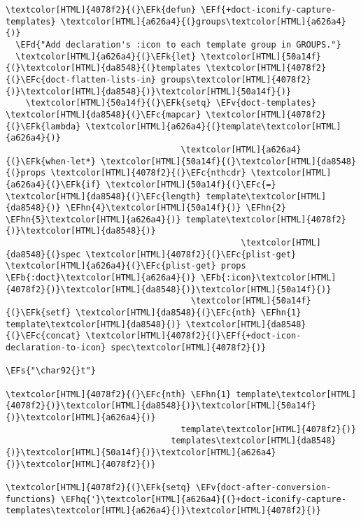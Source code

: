 \documentclass{scrartcl}
\newcommand{\EFk}[1]{\textcolor{EFk}{#1}} %
\newcommand{\EFd}[1]{\textcolor{EFd}{\textit{#1}}} %
\newcommand{\EFs}[1]{\textcolor{EFs}{#1}} %
\newcommand{\EFb}[1]{\textcolor{EFb}{#1}} %
\newcommand{\EFc}[1]{\textcolor{EFc}{#1}} %
\newcommand{\EFv}[1]{\textcolor{EFv}{#1}} %
\newcommand{\EFf}[1]{\textcolor{EFf}{#1}} %
\newcommand{\EFhn}[1]{\textcolor{EFhn}{\textbf{#1}}} %
\newcommand{\EFhq}[1]{\textcolor{EFhq}{#1}} %
\begin{document}
\begin{Code}
\begin{Verbatim}[]
\textcolor[HTML]{4078f2}{(}\EFk{defun} \EFf{+doct-iconify-capture-templates} \textcolor[HTML]{a626a4}{(}groups\textcolor[HTML]{a626a4}{)}
  \EFd{"Add declaration's :icon to each template group in GROUPS."}
  \textcolor[HTML]{a626a4}{(}\EFk{let} \textcolor[HTML]{50a14f}{(}\textcolor[HTML]{da8548}{(}templates \textcolor[HTML]{4078f2}{(}\EFc{doct-flatten-lists-in} groups\textcolor[HTML]{4078f2}{)}\textcolor[HTML]{da8548}{)}\textcolor[HTML]{50a14f}{)}
    \textcolor[HTML]{50a14f}{(}\EFk{setq} \EFv{doct-templates} \textcolor[HTML]{da8548}{(}\EFc{mapcar} \textcolor[HTML]{4078f2}{(}\EFk{lambda} \textcolor[HTML]{a626a4}{(}template\textcolor[HTML]{a626a4}{)}
                                   \textcolor[HTML]{a626a4}{(}\EFk{when-let*} \textcolor[HTML]{50a14f}{(}\textcolor[HTML]{da8548}{(}props \textcolor[HTML]{4078f2}{(}\EFc{nthcdr} \textcolor[HTML]{a626a4}{(}\EFk{if} \textcolor[HTML]{50a14f}{(}\EFc{=} \textcolor[HTML]{da8548}{(}\EFc{length} template\textcolor[HTML]{da8548}{)} \EFhn{4}\textcolor[HTML]{50a14f}{)} \EFhn{2} \EFhn{5}\textcolor[HTML]{a626a4}{)} template\textcolor[HTML]{4078f2}{)}\textcolor[HTML]{da8548}{)}
                                               \textcolor[HTML]{da8548}{(}spec \textcolor[HTML]{4078f2}{(}\EFc{plist-get} \textcolor[HTML]{a626a4}{(}\EFc{plist-get} props \EFb{:doct}\textcolor[HTML]{a626a4}{)} \EFb{:icon}\textcolor[HTML]{4078f2}{)}\textcolor[HTML]{da8548}{)}\textcolor[HTML]{50a14f}{)}
                                     \textcolor[HTML]{50a14f}{(}\EFk{setf} \textcolor[HTML]{da8548}{(}\EFc{nth} \EFhn{1} template\textcolor[HTML]{da8548}{)} \textcolor[HTML]{da8548}{(}\EFc{concat} \textcolor[HTML]{4078f2}{(}\EFf{+doct-icon-declaration-to-icon} spec\textcolor[HTML]{4078f2}{)}
                                                                    \EFs{"\char92{}t"}
                                                                    \textcolor[HTML]{4078f2}{(}\EFc{nth} \EFhn{1} template\textcolor[HTML]{4078f2}{)}\textcolor[HTML]{da8548}{)}\textcolor[HTML]{50a14f}{)}\textcolor[HTML]{a626a4}{)}
                                   template\textcolor[HTML]{4078f2}{)}
                                 templates\textcolor[HTML]{da8548}{)}\textcolor[HTML]{50a14f}{)}\textcolor[HTML]{a626a4}{)}\textcolor[HTML]{4078f2}{)}

\textcolor[HTML]{4078f2}{(}\EFk{setq} \EFv{doct-after-conversion-functions} \EFhq{'}\textcolor[HTML]{a626a4}{(}+doct-iconify-capture-templates\textcolor[HTML]{a626a4}{)}\textcolor[HTML]{4078f2}{)}
\end{Verbatim}
\end{Code}
\end{document}
